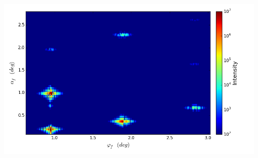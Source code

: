 \documentclass[landscape]{article}%
\begin{document}
\begin{minipage}[0.25\textwidth]{0.8\textwidth}%
\includegraphics[scale=0.8]{meso.png}%
\newline%
%
\end{minipage}%
\newpage%
\end{document}
